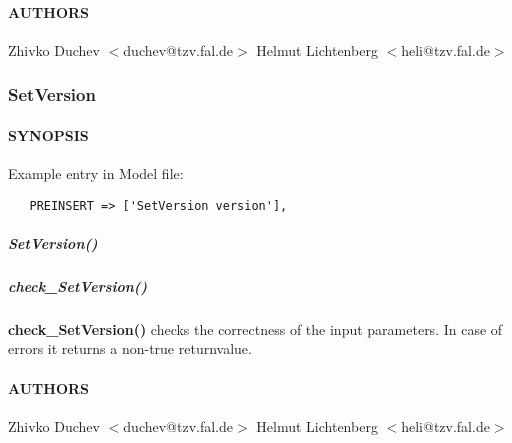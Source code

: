 \paragraph*{AUTHORS\label{SetNode_AUTHORS}}


Zhivko Duchev $<$duchev@tzv.fal.de$>$
Helmut Lichtenberg $<$heli@tzv.fal.de$>$

\subsubsection{SetVersion\label{SetVersion}}




\paragraph*{SYNOPSIS\label{SetVersion_SYNOPSIS}}


Example entry in Model file:

\begin{verbatim}
   PREINSERT => ['SetVersion version'],
\end{verbatim}
\subparagraph*{SetVersion()\label{SetVersion_SetVersion_}}
\subparagraph*{check\_SetVersion()\label{SetVersion_check_SetVersion_}}


\textbf{check\_SetVersion()} checks the correctness of the input parameters.
In case of errors it returns a non-true returnvalue.

\paragraph*{AUTHORS\label{SetVersion_AUTHORS}}


Zhivko Duchev $<$duchev@tzv.fal.de$>$
Helmut Lichtenberg $<$heli@tzv.fal.de$>$

